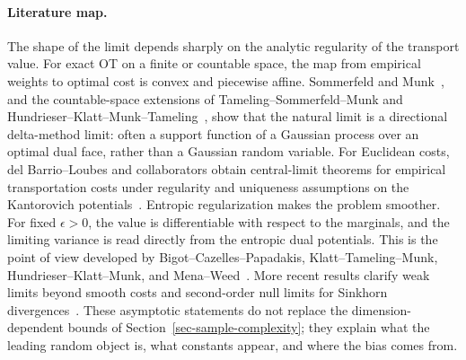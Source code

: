 \paragraph{Literature map.}
The shape of the limit depends sharply on the analytic regularity of the transport value.  For exact OT on a finite or countable space, the map from empirical weights to optimal cost is convex and piecewise affine.  Sommerfeld and Munk~\cite{sommerfeld2018inference}, and the countable-space extensions of Tameling--Sommerfeld--Munk and Hundrieser--Klatt--Munk--Tameling~\cite{tameling2017empirical,hundrieser2022empirical}, show that the natural limit is a directional delta-method limit: often a support function of a Gaussian process over an optimal dual face, rather than a Gaussian random variable.  For Euclidean costs, del Barrio--Loubes and collaborators obtain central-limit theorems for empirical transportation costs under regularity and uniqueness assumptions on the Kantorovich potentials~\cite{delBarrioLoubes2017clt,delBarrioGonzalezSanzLoubes2021central}.  Entropic regularization makes the problem smoother.  For fixed \(\epsilon>0\), the value is differentiable with respect to the marginals, and the limiting variance is read directly from the entropic dual potentials.  This is the point of view developed by Bigot--Cazelles--Papadakis, Klatt--Tameling--Munk, Hundrieser--Klatt--Munk, and Mena--Weed~\cite{bigot2017central,klatt2020empirical,hundrieser2021limit,mena2019statistical}.  More recent results clarify weak limits beyond smooth costs and second-order null limits for Sinkhorn divergences~\cite{gonzalezSanzHundrieser2023weak,goldfeld2022limit}.  These asymptotic statements do not replace the dimension-dependent bounds of Section~\ref{sec-sample-complexity}; they explain what the leading random object is, what constants appear, and where the bias comes from.

